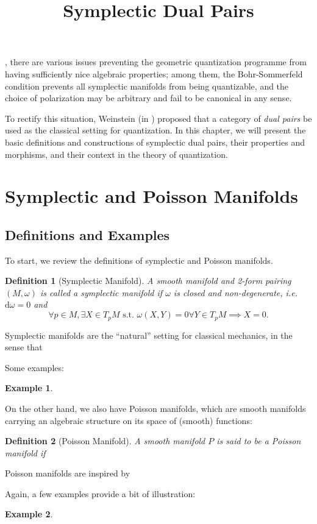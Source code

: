 \documentclass{tufte-handout}
\title{Symplectic Dual Pairs}
\newtheorem{example}{Example}
\newtheorem{defn}{Definition}
\def\d{\mathrm{d}}
\begin{document}
, there are various issues preventing the geometric quantization programme from having sufficiently nice algebraic properties; among them, the Bohr-Sommerfeld condition prevents all symplectic manifolds from being quantizable, and the choice of polarization may be arbitrary and fail to be canonical in any sense.

To rectify this situation, Weinstein (in \cite{weinsteindualpairs}) proposed that a category of \emph{dual pairs} be used as the classical setting for quantization. In this chapter, we will present the basic definitions and constructions of symplectic dual pairs, their properties and morphisms, and their context in the theory of quantization.



\section{Symplectic and Poisson Manifolds}

\subsection{Definitions and Examples}
To start, we review the definitions of symplectic and Poisson manifolds.

\begin{defn}[Symplectic Manifold]
A smooth manifold and 2-form pairing $(M,\omega)$ is called a \emph{symplectic manifold} if $\omega$ is closed and non-degenerate, i.e. $\d\omega = 0$ and
$$
\forall p \in M, \exists X \in T_pM \mbox{ s.t. } \omega(X,Y) = 0 \forall Y \in T_pM \implies X = 0.
$$
\end{defn}
Symplectic manifolds are the ``natural'' setting for classical mechanics, in the sense that %

Some examples:
\begin{example}

\end{example}

On the other hand, we also have Poisson manifolds, which are smooth manifolds carrying an algebraic structure on its space of (smooth) functions:
\begin{defn}[Poisson Manifold]
A smooth manifold $P$ is said to be a \emph{Poisson manifold} if %
\end{defn}
Poisson manifolds are inspired by%

Again, a few examples provide a bit of illustration:
\begin{example}

\end{example}
\end{document}
